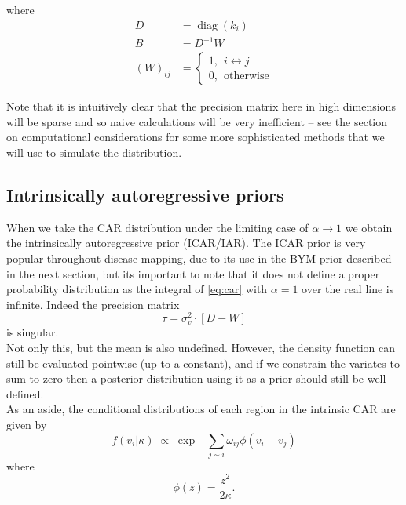 \documentclass[11pt]{report}
\begin{document}
where
\begin{align}
D &= \operatorname{diag}(k_i)  \\
B &= D^{-1} W \\
{(W)}_{ij} &= 
\begin{cases}
1, \ \ i \leftrightarrow j \\
0, \ \ \textrm{otherwise}
\end{cases}
\end{align} 

Note that it is intuitively clear that the precision matrix here in high dimensions will be sparse and so naive calculations will be very inefficient -- see the section on computational considerations for some more sophisticated methods that we will use to simulate the distribution.

\subsection{Intrinsically autoregressive priors}

When we take the CAR distribution under the limiting case of $\alpha \to 1$ we obtain the intrinsically autoregressive prior (ICAR/IAR). The ICAR prior is very popular throughout disease mapping, due to its use in the BYM prior described in the next section, but its important to note that it does not define a proper probability distribution as the integral of \ref{eq:car} with $\alpha = 1$ over the real line is infinite. Indeed the precision matrix
\begin{equation}
\tau = \sigma_v^2 \cdot [D - W]
\end{equation}
is singular. \\

Not only this, but the mean is also undefined. However, the density function can still be evaluated pointwise (up to a constant), and if we constrain the variates to sum-to-zero then a posterior distribution using it as a prior should still be well defined. \\

As an aside, the conditional distributions of each region in the intrinsic CAR are given by
\begin{equation} \label{aside}
f(v_i | \kappa) \; \propto \; \exp{- \sum_{j \sim i} \omega_{ij} \phi(v_i - v_j)}
\end{equation}
where
\begin{equation*}
\phi(z) = \frac{z^2}{2\kappa}.
\end{equation*} \\
\end{document}
